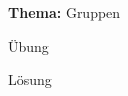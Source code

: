 \begin{uebungsblatt}

\textbf{Thema:} Gruppen
\vspace{0.5cm}
%
%
\begin{uebung}
	Übung
\end{uebung}
\begin{loesung}
	Lösung
\end{loesung}

\end{uebungsblatt}